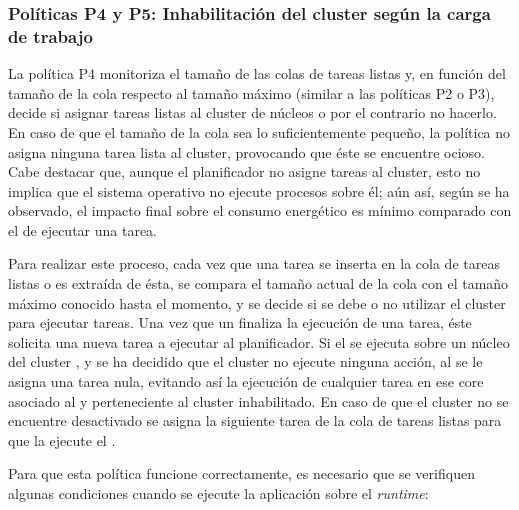 \subsubsection{Políticas P4 y P5: Inhabilitación del cluster según la
  carga de trabajo}

La política P4 monitoriza el tamaño de las colas de tareas listas y, en
función del tamaño de la cola respecto al tamaño máximo (similar a las
políticas P2 o P3), decide si asignar tareas listas al cluster de núcleos
\LITTLE o por el contrario no hacerlo. En caso de que el tamaño de la cola
sea lo suficientemente pequeño, la política no asigna ninguna tarea lista
al cluster, provocando que éste se encuentre ocioso. Cabe destacar que,
aunque el planificador no asigne tareas al cluster, esto no implica que el
sistema operativo no ejecute procesos sobre él; aún así, según se ha
observado, el impacto final sobre el consumo energético es mínimo comparado
con el de ejecutar una tarea.

Para realizar este proceso, cada vez que una tarea se inserta en la cola de
tareas listas o es extraída de ésta, se compara el tamaño actual de la cola
con el tamaño máximo conocido hasta el momento, y se decide si se debe
o no utilizar el cluster para ejecutar tareas. Una vez que un \wt
finaliza la ejecución de una tarea, éste solicita una nueva tarea a
ejecutar al planificador. Si el \wt se ejecuta sobre un núcleo del cluster
\LITTLE, y se ha decidido que el cluster no ejecute ninguna acción, al \wt
se le asigna una tarea nula, evitando así la ejecución de cualquier tarea
en ese core asociado al \wt y perteneciente al cluster inhabilitado. En
caso de que el cluster no se encuentre desactivado se asigna la siguiente
tarea de la cola de tareas listas para que la ejecute el \wt.

Para que esta política funcione correctamente, es necesario que se
verifiquen algunas condiciones cuando se ejecute la aplicación sobre el
\emph{runtime}:

